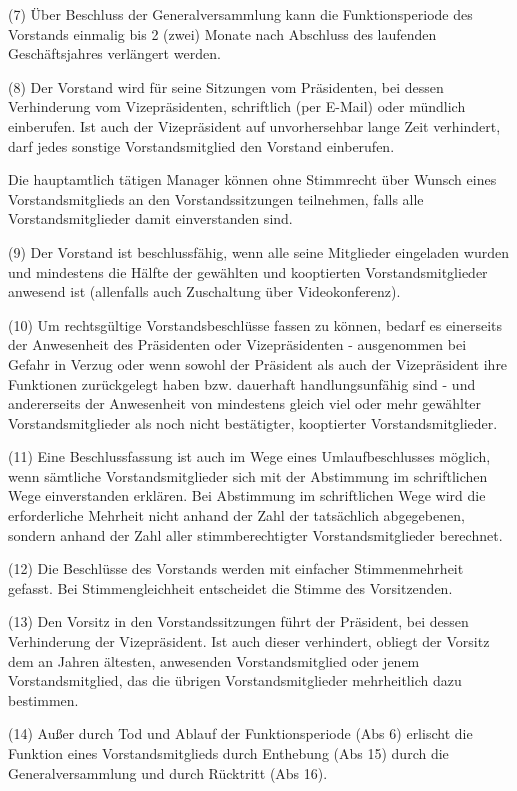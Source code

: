 \documentclass[11pt,a4paper]{article}
\begin{document}
(7)
Über Beschluss der Generalversammlung kann die Funktionsperiode des Vorstands einmalig bis 2 (zwei) Monate nach Abschluss des laufenden Geschäftsjahres verlängert werden.

(8)
Der Vorstand wird für seine Sitzungen vom Präsidenten, bei dessen Verhinderung vom Vizepräsidenten, schriftlich (per E-Mail) oder mündlich einberufen.
Ist auch der Vizepräsident auf unvorhersehbar lange Zeit verhindert, darf jedes sonstige Vorstandsmitglied den Vorstand einberufen.

Die hauptamtlich tätigen Manager können ohne Stimmrecht über Wunsch eines Vorstandsmitglieds an den Vorstandssitzungen teilnehmen, falls alle Vorstandsmitglieder damit einverstanden sind.

(9)
Der Vorstand ist beschlussfähig, wenn alle seine Mitglieder eingeladen wurden und mindestens die Hälfte der gewählten und kooptierten Vorstandsmitglieder anwesend ist (allenfalls auch Zuschaltung über Videokonferenz).

(10)
Um rechtsgültige Vorstandsbeschlüsse fassen zu können, bedarf es einerseits der Anwesenheit des Präsidenten oder Vizepräsidenten - ausgenommen bei Gefahr in Verzug oder wenn sowohl der Präsident als auch der Vizepräsident ihre Funktionen zurückgelegt haben bzw. dauerhaft handlungsunfähig sind - und andererseits der Anwesenheit von mindestens gleich viel oder mehr gewählter Vorstandsmitglieder als noch nicht bestätigter, kooptierter Vorstandsmitglieder.

(11)
Eine Beschlussfassung ist auch im Wege eines Umlaufbeschlusses möglich, wenn sämtliche Vorstandsmitglieder sich mit der Abstimmung im schriftlichen Wege einverstanden erklären.
Bei Abstimmung im schriftlichen Wege wird die erforderliche Mehrheit nicht anhand der Zahl der tatsächlich abgegebenen, sondern anhand der Zahl aller stimmberechtigter Vorstandsmitglieder berechnet.

(12)
Die Beschlüsse des Vorstands werden mit einfacher Stimmenmehrheit gefasst.
Bei Stimmengleichheit entscheidet die Stimme des Vorsitzenden.

(13)
Den Vorsitz in den Vorstandssitzungen führt der Präsident, bei dessen Verhinderung der Vizepräsident.
Ist auch dieser verhindert, obliegt der Vorsitz dem an Jahren ältesten, anwesenden Vorstandsmitglied oder jenem Vorstandsmitglied, das die übrigen Vorstandsmitglieder mehrheitlich dazu bestimmen.

(14)
Außer durch Tod und Ablauf der Funktionsperiode (Abs 6) erlischt die Funktion eines Vorstandsmitglieds durch Enthebung (Abs 15) durch die Generalversammlung und durch Rücktritt (Abs 16).
\end{document}
